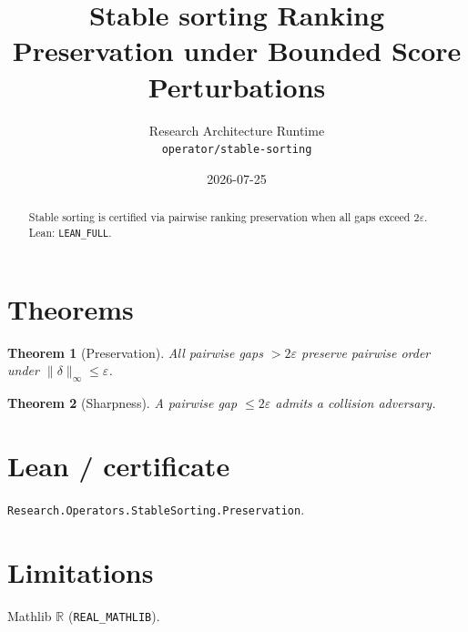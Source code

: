 \documentclass[11pt]{article}
\title{Stable sorting Ranking Preservation under Bounded Score Perturbations}
\author{Research Architecture Runtime \\ \texttt{operator/stable-sorting}}
\date{2026-07-25}
\newtheorem{theorem}{Theorem}
\begin{document}
\maketitle
\begin{abstract}
Stable sorting is certified via pairwise ranking preservation when all gaps exceed $2\varepsilon$. Lean: \texttt{LEAN\_FULL}.
\end{abstract}
\section{Theorems}
\begin{theorem}[Preservation]
All pairwise gaps $>2\varepsilon$ preserve pairwise order under $\|\delta\|_\infty\le\varepsilon$.
\end{theorem}
\begin{theorem}[Sharpness]
A pairwise gap $\le 2\varepsilon$ admits a collision adversary.
\end{theorem}
\section{Lean / certificate}
\texttt{Research.Operators.StableSorting.Preservation}.
\section{Limitations}
Mathlib $\mathbb{R}$ (\texttt{REAL\_MATHLIB}).
\end{document}
